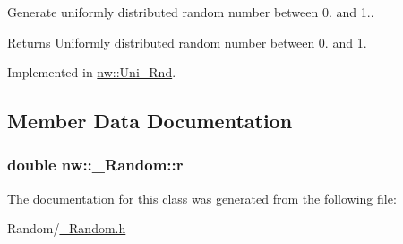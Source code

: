 Generate uniformly distributed random number between 0. and 1.. 

\begin{DoxyReturn}{Returns}
Uniformly distributed random number between 0. and 1. 
\end{DoxyReturn}


Implemented in \hyperlink{classnw_1_1_uni___rnd_ad7883ef0ce4c591612bcb41678104773}{nw\+::\+Uni\+\_\+\+Rnd}.



\subsection{Member Data Documentation}
\hypertarget{classnw_1_1___random_acfb88075bfcae45bbbd989568cef5250}{
\subsubsection[{r}]{\setlength{\rightskip}{0pt plus 5cm}double nw\+::\+\_\+\+Random\+::r\hspace{0.3cm}{\ttfamily [private]}}}\label{classnw_1_1___random_acfb88075bfcae45bbbd989568cef5250}


The documentation for this class was generated from the following file\+:\begin{DoxyCompactItemize}
\item 
Random/\hyperlink{___random_8h}{\+\_\+\+Random.\+h}\end{DoxyCompactItemize}

